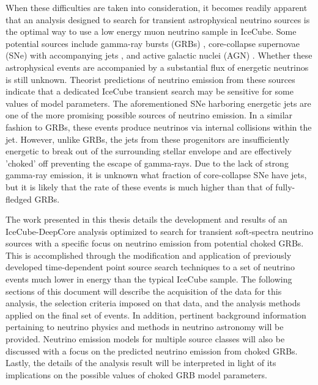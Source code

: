 \documentclass{gatech-thesis}
\begin{document}
When these difficulties are taken into consideration, it becomes readily apparent that an analysis designed to search for transient astrophysical neutrino sources is the optimal way to use a low energy muon neutrino sample in IceCube. Some potential sources include gamma-ray bursts (GRBs) \cite{2014arXiv1410.0679K}, core-collapse supernovae (SNe) with accompanying jets \cite{2004PhRvL..93r1101R}, and active galactic nuclei (AGN) \cite{2009APh....31..138B}. Whether these astrophysical events are accompanied by a substantial flux of energetic neutrinos is still unknown. Theorist predictions of neutrino emission from these sources indicate that a dedicated IceCube transient search may be sensitive for some values of model parameters. The aforementioned SNe harboring energetic jets are one of the more promising possible sources of neutrino emission. In a similar fashion to GRBs, these events produce neutrinos via internal collisions within the jet. However, unlike GRBs, the jets from these progenitors are insufficiently energetic to break out of the surrounding stellar envelope and are effectively 'choked' off preventing the escape of gamma-rays. Due to the lack of strong gamma-ray emission, it is unknown what fraction of core-collapse SNe have jets, but it is likely that the rate of these events is much higher than that of fully-fledged GRBs.

The work presented in this thesis details the development and results of an IceCube-DeepCore analysis optimized to search for transient soft-spectra neutrino sources with a specific focus on neutrino emission from potential choked GRBs. This is accomplished through the modification and application of previously developed time-dependent point source search techniques to a set of neutrino events much lower in energy than the typical IceCube sample. The following sections of this document will describe the acquisition of the data for this analysis, the selection criteria imposed on that data, and the analysis methods applied on the final set of events. In addition, pertinent background information pertaining to neutrino physics and methods in neutrino astronomy will be provided. Neutrino emission models for multiple source classes will also be discussed with a focus on the predicted neutrino emission from choked GRBs. Lastly, the details of the analysis result will be interpreted in light of its implications on the possible values of choked GRB model parameters.
\end{document}

